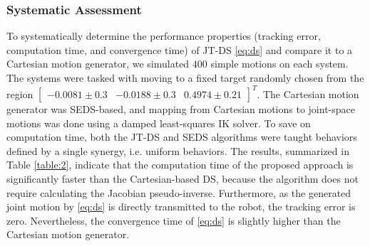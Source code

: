 \documentclass[letterpaper, 10 pt, conference,fleqn]{ieeeconf}
\begin{document}
\subsubsection{Systematic Assessment}
To systematically determine the performance properties (tracking error, computation time, and convergence time) of JT-DS \eqref{eq:ds} and compare it to a Cartesian motion generator, we simulated $400$ simple motions on each system. The systems were tasked with moving to a fixed target randomly chosen from the region $\begin{bmatrix} -0.0081\pm0.3&-0.0188\pm0.3&0.4974\pm0.21 \end{bmatrix}^T$. The Cartesian motion generator was SEDS-based, and mapping from Cartesian motions to joint-space motions was done using a damped least-squares IK solver. To save on computation time, both the JT-DS and SEDS algorithms were taught behaviors defined by a single synergy, i.e. uniform behaviors.  The results, summarized in Table \ref{table:2}, indicate that the computation time of the proposed approach is significantly faster than the Cartesian-based DS, because the algorithm does not require calculating the Jacobian pseudo-inverse. Furthermore, as the generated joint motion by \eqref{eq:ds} is directly transmitted to the robot, the tracking error is zero. Nevertheless, the convergence time of  \eqref{eq:ds} is slightly higher than the Cartesian motion generator.




\begin{table}[t]
	\centering
	\caption{Parameters and Performance of Comparative Experiments \textcolor{red}{(REDO)} }
	\label{table:1}
	\vspace{-10pt}
\end{table}
\end{document}
